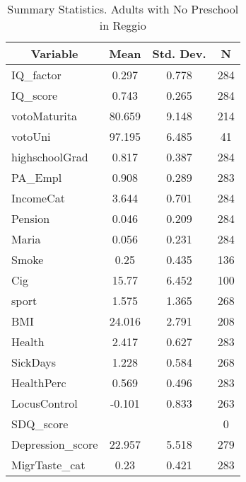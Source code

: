 
\begin{table}[htbp]\centering \caption{Summary Statistics. Adults with No Preschool in Reggio \label{bothAdultmaternaNoneReggio}}
\begin{tabular}{l c c  c}\hline\hline
\multicolumn{1}{c}{\textbf{Variable}} & \textbf{Mean}
 & \textbf{Std. Dev.} & \textbf{N}\\ \hline
IQ\_factor & 0.297 & 0.778  & 284\\
IQ\_score & 0.743 & 0.265  & 284\\
votoMaturita & 80.659 & 9.148  & 214\\
votoUni & 97.195 & 6.485  & 41\\
highschoolGrad & 0.817 & 0.387  & 284\\
PA\_Empl & 0.908 & 0.289  & 283\\
IncomeCat & 3.644 & 0.701  & 284\\
Pension & 0.046 & 0.209  & 284\\
Maria & 0.056 & 0.231  & 284\\
Smoke & 0.25 & 0.435  & 136\\
Cig & 15.77 & 6.452  & 100\\
sport & 1.575 & 1.365  & 268\\
BMI & 24.016 & 2.791  & 208\\
Health & 2.417 & 0.627  & 283\\
SickDays & 1.228 & 0.584  & 268\\
HealthPerc & 0.569 & 0.496  & 283\\
LocusControl & -0.101 & 0.833  & 263\\
SDQ\_score &  &   & 0\\
Depression\_score & 22.957 & 5.518  & 279\\
MigrTaste\_cat & 0.23 & 0.421  & 283\\
\hline\end{tabular}
\end{table}
